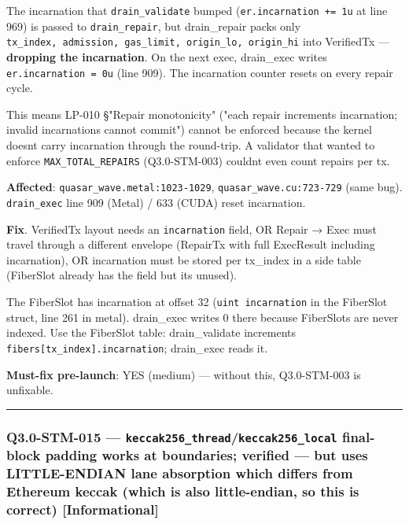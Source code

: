 \documentclass[
]{article}
\begin{document}
The incarnation that \texttt{drain\_validate} bumped
(\texttt{er.incarnation\ +=\ 1u} at line 969) is passed to
\texttt{drain\_repair}, but drain\_repair packs only
\texttt{tx\_index,\ admission,\ gas\_limit,\ origin\_lo,\ origin\_hi}
into VerifiedTx --- \textbf{dropping the incarnation}. On the next exec,
drain\_exec writes \texttt{er.incarnation\ =\ 0u} (line 909). The
incarnation counter resets on every repair cycle.

This means LP-010 §"Repair monotonicity" ("each repair increments
incarnation; invalid incarnations cannot commit") cannot be enforced
because the kernel doesn\textquotesingle t carry incarnation through the
round-trip. A validator that wanted to enforce
\texttt{MAX\_TOTAL\_REPAIRS} (Q3.0-STM-003) couldn\textquotesingle t
even count repairs per tx.

\textbf{Affected}: \texttt{quasar\_wave.metal:1023-1029},
\texttt{quasar\_wave.cu:723-729} (same bug). \texttt{drain\_exec} line
909 (Metal) / 633 (CUDA) reset incarnation.

\textbf{Fix}. VerifiedTx layout needs an \texttt{incarnation} field, OR
Repair → Exec must travel through a different envelope (RepairTx with
full ExecResult including incarnation), OR incarnation must be stored
per tx\_index in a side table (FiberSlot already has the field but
it\textquotesingle s unused).

The FiberSlot has incarnation at offset 32 (\texttt{uint\ incarnation}
in the FiberSlot struct, line 261 in metal). drain\_exec writes 0 there
because FiberSlots are never indexed. Use the FiberSlot table:
drain\_validate increments \texttt{fibers{[}tx\_index{]}.incarnation};
drain\_exec reads it.

\textbf{Must-fix pre-launch}: YES (medium) --- without this,
Q3.0-STM-003 is unfixable.

\begin{center}\rule{0.5\linewidth}{0.5pt}\end{center}

\subsubsection{\texorpdfstring{Q3.0-STM-015 ---
\texttt{keccak256\_thread}/\texttt{keccak256\_local} final-block padding
works at boundaries; verified --- but uses LITTLE-ENDIAN lane absorption
which differs from Ethereum keccak (which is also little-endian, so this
is correct)
{[}Informational{]}}{Q3.0-STM-015 --- keccak256\_thread/keccak256\_local final-block padding works at boundaries; verified --- but uses LITTLE-ENDIAN lane absorption which differs from Ethereum keccak (which is also little-endian, so this is correct) {[}Informational{]}}}\label{q30-stm-015--keccak256_threadkeccak256_local-final-block-padding-works-at-boundaries-verified--but-uses-little-endian-lane-absorption-which-differs-from-ethereum-keccak-which-is-also-little-endian-so-this-is-correct-informational}
\end{document}
